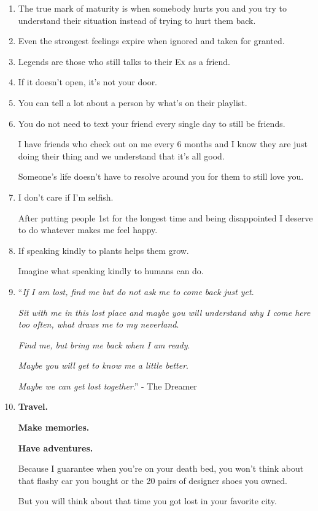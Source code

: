 \documentclass{article}
\numberwithin{equation}{section}
\begin{document}
\begin{enumerate}
    Do more.
    \item The true mark of maturity is when somebody hurts you and you try to understand their situation instead of trying to hurt them back.
    \item Even the strongest feelings expire when ignored and taken for granted.
    \item Legends are those who still talks to their \textsc{Ex} as a friend.
    \item If it doesn't open, it's not your door.
    \item You can tell a lot about a person by what's on their playlist.
    \item You do not need to text your friend every single day to still be friends.
    
    I have friends who check out on me every 6 months and I know they are just doing their thing and we understand that it's all good.
    
    Someone's life doesn't have to resolve around you for them to still love you.
    \item I don't care if I'm selfish.
    
    After putting people 1st for the longest time and being disappointed I deserve to do whatever makes me feel happy.
    \item If speaking kindly to plants helps them grow.
    
    Imagine what speaking kindly to humans can do.
    \item ``\textit{If I am lost, find me but do not ask me to come back just yet}.
    
    \textit{Sit with me in this lost place and maybe you will understand why I come here too often, what draws me to my neverland}.
    
    \textit{Find me, but bring me back when I am ready}.
    
    \textit{Maybe you will get to know me a little better}.
    
    \textit{Maybe we can get lost together}.'' - The Dreamer
    \item \textbf{Travel.}
    
    \textbf{Make memories.}
    
    \textbf{Have adventures.}
    
    Because I guarantee when you're on your death bed, you won't think about that flashy car you bought or the 20 pairs of designer shoes you owned.
    
    But you will think about that time you got lost in your favorite city.
    

\end{enumerate}
\end{document}
